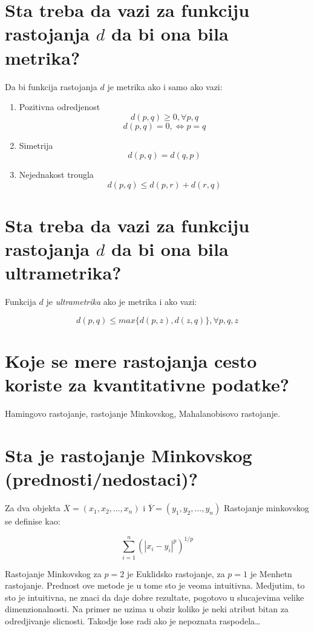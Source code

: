 \documentclass[a4paper]{article}
\begin{document}
\section{Sta treba da vazi za funkciju rastojanja \(d\) da bi ona bila metrika?}

Da bi funkcija rastojanja \(d\) je metrika ako i samo ako vazi:

\begin{enumerate}
    \item Pozitivna odredjenost
        \[d(p, q) \geq 0, \forall p, q\]
        \[d(p, q) = 0, \iff p = q\]
    \item Simetrija
        \[d(p, q) = d(q, p)\]
    \item Nejednakost trougla
        \[d(p, q) \leq d(p, r) + d(r, q)\]
\end{enumerate}

\section{Sta treba da vazi za funkciju rastojanja \(d\) da bi ona bila ultrametrika?}

Funkcija \(d\) je \emph{ultrametrika} ako je metrika i ako vazi:

\[d(p, q) \leq max\{d(p, z), d(z, q)\}, \forall p, q, z\]

\section{Koje se mere rastojanja cesto koriste za kvantitativne podatke?}

Hamingovo rastojanje, rastojanje Minkovskog, Mahalanobisovo rastojanje.

\section{Sta je rastojanje Minkovskog (prednosti/nedostaci)?}

Za dva objekta \(\overline{X}=(x_1,x_2,\ldots,x_n)\) i \(\overline{Y}=(y_1,y_2,\ldots,y_n)\)
Rastojanje minkovskog se definise kao:

\[\sum_{i=1}^{n} {({|x_i - y_i|}^p)}^{1/p}\]

Rastojanje Minkovskog za \(p = 2\) je Euklidsko rastojanje, za \(p = 1\) je Menhetn
rastojanje. Prednost ove metode je u tome sto je veoma intuitivna. Medjutim, to sto je intuitivna,
ne znaci da daje dobre rezultate, pogotovo u slucajevima velike dimenzionalnosti. Na primer ne uzima
u obzir koliko je neki atribut bitan za odredjivanje slicnosti. Takodje lose radi ako je nepoznata
raspodela\ldots
\end{document}
